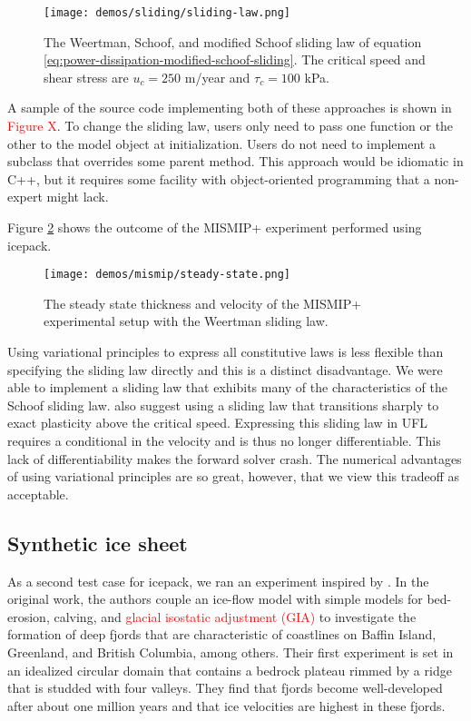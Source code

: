 \documentclass{article}
\theoremstyle{definition}
\theoremstyle{plain}
\begin{document}
\begin{figure}[h]
    \texttt{[image: demos/sliding/sliding-law.png]}
    \caption{The Weertman, Schoof, and modified Schoof sliding law of equation \eqref{eq:power-dissipation-modified-schoof-sliding}.
    The critical speed and shear stress are $u_c = 250$ m/year and $\tau_c = 100$ kPa.}
    \label{fig:sliding-laws}
\end{figure}

A sample of the source code implementing both of these approaches is shown in \textcolor{red}{Figure X}.
To change the sliding law, users only need to pass one function or the other to the model object at initialization.
Users do not need to implement a subclass that overrides some parent method.
This approach would be idiomatic in C++, but it requires some facility with object-oriented programming that a non-expert might lack.

Figure \ref{fig:mismip} shows the outcome of the MISMIP+ experiment performed using icepack.

\begin{figure}[h]
    \texttt{[image: demos/mismip/steady-state.png]}
    \caption{The steady state thickness and velocity of the MISMIP+ experimental setup with the Weertman sliding law.}
    \label{fig:mismip}
\end{figure}

Using variational principles to express all constitutive laws is less flexible than specifying the sliding law directly and this is a distinct disadvantage.
We were able to implement a sliding law that exhibits many of the characteristics of the Schoof sliding law.
\citet{asay2016experimental} also suggest using a sliding law that transitions sharply to exact plasticity above the critical speed.
Expressing this sliding law in UFL requires a conditional in the velocity and is thus no longer differentiable.
This lack of differentiability makes the forward solver crash.
The numerical advantages of using variational principles are so great, however, that we view this tradeoff as acceptable.


\subsection{Synthetic ice sheet}
As a second test case for icepack, we ran an experiment inspired by \cite{kessler2008fjord}. In the original work, the authors couple an ice-flow model with simple models for bed-erosion, calving, and \textcolor{red}{glacial isostatic adjustment (GIA)} to investigate the formation of deep fjords that are characteristic of coastlines on Baffin Island, Greenland, and British Columbia, among others. Their first experiment is set in an idealized circular domain that contains a bedrock plateau rimmed by a ridge that is studded with four valleys. They find that fjords become well-developed after about one million years and that ice velocities are highest in these fjords. 
\end{document}
